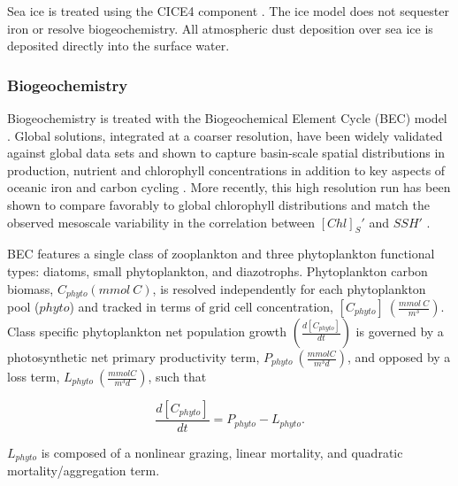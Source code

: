 \documentclass{article}
\begin{document}
Sea ice is treated using the CICE4 component \parencite{HunkeCICEAlamosSea2008}. The ice model does not sequester iron or resolve biogeochemistry. All atmospheric dust deposition over sea ice is deposited directly into the surface water.


\subsubsection{Biogeochemistry}

Biogeochemistry is treated with the Biogeochemical Element Cycle (BEC) model \parencite{MooreMarineEcosystemDynamics2013}. Global solutions, integrated at a coarser resolution, have been widely validated against global data sets and shown to capture basin-scale spatial distributions in production, nutrient and chlorophyll concentrations \parencite{DoneySkillmetricsconfronting2009g,MooreIroncyclingnutrientlimitation2001, MooreUpperoceanecosystem2004,MooreMarineEcosystemDynamics2013} in addition to key aspects of oceanic iron \parencite{MooreSedimentarymineraldust2008} and carbon cycling \parencite{MooreMarineEcosystemDynamics2013,LimaDynamicsparticulateorganic2014,LongTwentiethCenturyOceanicCarbon2013}. More recently, this high resolution run has been shown to compare favorably to global chlorophyll distributions \parencite{HarrisonMesoscaleEffectsCarbon2018} and match the observed mesoscale variability in the correlation between $[Chl]_{S}'$ and $SSH'$ \parencite{SongSeasonalvariationcorrelation2018}.

BEC features a single class of zooplankton and three phytoplankton functional types: diatoms, small phytoplankton, and diazotrophs. Phytoplankton carbon biomass, $C_{phyto} (mmol \ C)$, is resolved independently for each phytoplankton pool ($phyto$) and tracked in terms of grid cell concentration, $[C_{phyto}]\ (\frac{mmol \ C}{m^3})$. Class specific phytoplankton net population growth $(\frac{d[C_{phyto}]}{dt})$ is governed by a photosynthetic net primary productivity term, $P_{phyto}\ (\frac{mmol C}{m^3d})$, and opposed by a loss term, $L_{phyto}\ (\frac{mmol C}{m^3d})$, such that

\begin{equation}
    \frac{d[C_{phyto}]}{dt} = P_{phyto} - L_{phyto}.
\end{equation}

$L_{phyto}$ is composed of a nonlinear grazing, linear mortality, and quadratic mortality/aggregation term.
\end{document}
